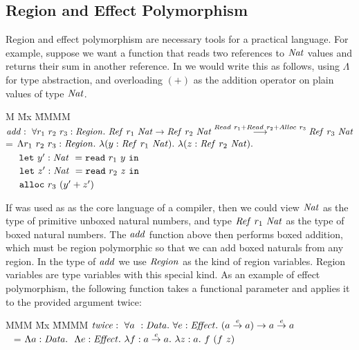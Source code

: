 \subsection{Region and Effect Polymorphism}
\label{s:RegionPolymorphism}
Region and effect polymorphism are necessary tools for a practical language. For example, suppose we want a function that reads two references to $\mathit{Nat}$ values and returns their sum in another reference. In \SystemFre we would write this as follows, using $\Lambda$ for type abstraction, and overloading $(+)$ as the addition operator on plain values of type $\mathit{Nat}$. 

\begin{tabbing}
M \= Mx \= MMMM \kill
\> $\mathit{add} :~ 
        \forall r_1~ r_2~ r_3: \mathit{Region}
        .~  \mathit{Ref}~ r_1~ \mathit{Nat} 
        \to \mathit{Ref}~ r_2~ \mathit{Nat}
        \stackrel{Read~ r_1 + Read~ r_2 + Alloc~ r_3}{\longrightarrow}
            \mathit{Ref}~ r_3~ \mathit{Nat}$ \\
\> \> = $\Lambda r_1~ r_2~ r_3 : \mathit{Region}
        .~  \lambda (y : \mathit{Ref}~ r_1~ \mathit{Nat})
        .~  \lambda (z : \mathit{Ref}~ r_2~ \mathit{Nat}).$         \\
\> \> ~~ $\texttt{let}~ y' : \mathit{Nat}~ = \texttt{read}~ r_1~ y~ \texttt{in}$             \\
\> \> ~~ $\texttt{let}~ z' : \mathit{Nat}~ = \texttt{read}~ r_2~ z~ \texttt{in}$             \\
\> \> ~~ $\texttt{alloc}~ r_3~ (y' + z')$
\end{tabbing}

If \SystemFre was used as as the core language of a compiler, then we could view $\mathit{Nat}$ as the type of primitive unboxed natural numbers, and type $\mathit{Ref}~ r_1~ \mathit{Nat}$ as the type of boxed natural numbers. The $\mathit{add}$ function above then performs boxed addition, which must be region polymorphic so that we can add boxed naturals from any region. In the type of $\mathit{add}$ we use $\mathit{Region}$ as the kind of region variables. Region variables are type variables with this special kind. As an example of effect polymorphism, the following function takes a functional parameter and applies it to the provided argument twice:

\begin{tabbing}
MMM \= Mx \= MMMM \kill
\> $\mathit{twice} :~
           \forall a~ : \mathit{Data}.~ \forall e : \mathit{Effect}.~ (a \stackrel{e}{\rightarrow} a) \to a \stackrel{e}{\rightarrow} a$ \\
\> \> ~ = $\Lambda a : \mathit{Data}
        .~~ \Lambda e : \mathit{Effect}
        .~ \lambda f : a \stackrel{e}{\rightarrow} a
        .~ \lambda z : a.~ f~ (f~ z)$
\end{tabbing}

